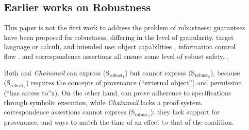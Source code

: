 {%
\vspace{.04in}
 
 \subsection{Earlier works on Robustness} 
This paper is not the first work to address the problem of robustness:
 guarantees have been proposed for  robustness, differing in the level 
of granularity,   target  language or calculi, and intended use:
object capabilities  \cite{MillerPhD, dd, threoremsFreeSep}, 
information control flow \cite{Zdancewic:Myers:01,noninteferenceOS}, 
and correspondence assertions \cite{Maffeis:aiamb:thesis00}
all
ensure some level of robust safety. 
.
 

  Both {} \cite{VerX} and  \emph{Chainmail} \cite{FASE} can express (S$_{\text{robust}_1}$) but
  {}  cannot express (S$_{\text{robust}_2}$), because 
(S$_{\text{robust}_2}$)  requires the concepts of provenance (``external object'') and
  permission (``has access to''x).
On the other hand, {} can prove adherence to  specifications through symbolic 
  execution, while  \emph{Chainmail}   lacks a proof system. 
       correspondence assertions cannot express (S$_{\text{robust}_2}$): they lack
    support for provenance, and ways to match the time of an effect to that of the
    condition.%
  
\vspace{.04in}

}
